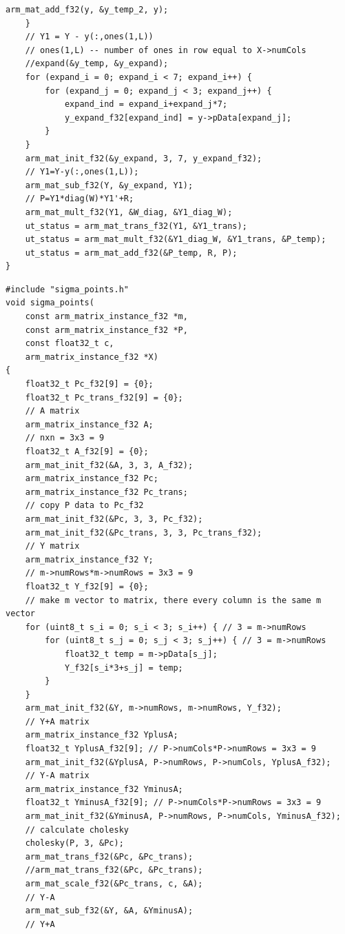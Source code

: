 \begin{lstlisting}[caption=ut.c]
        arm_mat_add_f32(y, &y_temp_2, y);
    }    
    // Y1 = Y - y(:,ones(1,L))
    // ones(1,L) -- number of ones in row equal to X->numCols
    //expand(&y_temp, &y_expand);
    for (expand_i = 0; expand_i < 7; expand_i++) {
        for (expand_j = 0; expand_j < 3; expand_j++) {
            expand_ind = expand_i+expand_j*7;
            y_expand_f32[expand_ind] = y->pData[expand_j];
        }
    }
    arm_mat_init_f32(&y_expand, 3, 7, y_expand_f32);
    // Y1=Y-y(:,ones(1,L));
    arm_mat_sub_f32(Y, &y_expand, Y1);
    // P=Y1*diag(W)*Y1'+R;
    arm_mat_mult_f32(Y1, &W_diag, &Y1_diag_W);
    ut_status = arm_mat_trans_f32(Y1, &Y1_trans);
    ut_status = arm_mat_mult_f32(&Y1_diag_W, &Y1_trans, &P_temp);
    ut_status = arm_mat_add_f32(&P_temp, R, P);
}
\end{lstlisting}

\begin{lstlisting}[caption=sigma\_points.c]
#include "sigma_points.h"
void sigma_points(
    const arm_matrix_instance_f32 *m,
    const arm_matrix_instance_f32 *P,
    const float32_t c,
    arm_matrix_instance_f32 *X)
{
    float32_t Pc_f32[9] = {0};
    float32_t Pc_trans_f32[9] = {0};
    // A matrix
    arm_matrix_instance_f32 A;
    // nxn = 3x3 = 9
    float32_t A_f32[9] = {0};
    arm_mat_init_f32(&A, 3, 3, A_f32);
    arm_matrix_instance_f32 Pc;
    arm_matrix_instance_f32 Pc_trans;
    // copy P data to Pc_f32
    arm_mat_init_f32(&Pc, 3, 3, Pc_f32);
    arm_mat_init_f32(&Pc_trans, 3, 3, Pc_trans_f32);
    // Y matrix
    arm_matrix_instance_f32 Y;
    // m->numRows*m->numRows = 3x3 = 9
    float32_t Y_f32[9] = {0};
    // make m vector to matrix, there every column is the same m vector
    for (uint8_t s_i = 0; s_i < 3; s_i++) { // 3 = m->numRows
        for (uint8_t s_j = 0; s_j < 3; s_j++) { // 3 = m->numRows
            float32_t temp = m->pData[s_j];
            Y_f32[s_i*3+s_j] = temp;
        }
    }
    arm_mat_init_f32(&Y, m->numRows, m->numRows, Y_f32);
    // Y+A matrix
    arm_matrix_instance_f32 YplusA;
    float32_t YplusA_f32[9]; // P->numCols*P->numRows = 3x3 = 9
    arm_mat_init_f32(&YplusA, P->numRows, P->numCols, YplusA_f32);
    // Y-A matrix
    arm_matrix_instance_f32 YminusA;
    float32_t YminusA_f32[9]; // P->numCols*P->numRows = 3x3 = 9
    arm_mat_init_f32(&YminusA, P->numRows, P->numCols, YminusA_f32);
    // calculate cholesky
    cholesky(P, 3, &Pc);
    arm_mat_trans_f32(&Pc, &Pc_trans);
    //arm_mat_trans_f32(&Pc, &Pc_trans);
    arm_mat_scale_f32(&Pc_trans, c, &A);
    // Y-A
    arm_mat_sub_f32(&Y, &A, &YminusA);
    // Y+A

\end{lstlisting}
